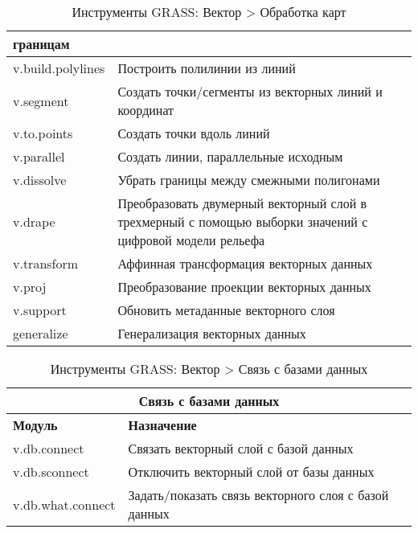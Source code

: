 {\begin{table}[H]
\begin{tabular}{|p{3cm}|p{12cm}|}
  границам \\
  \hline v.build.polylines & Построить полилинии из линий \\
  \hline v.segment & Создать точки/сегменты из векторных линий и
  координат \\
  \hline v.to.points & Создать точки вдоль линий \\
  \hline v.parallel & Создать линии, параллельные исходным \\
  \hline v.dissolve & Убрать границы между смежными полигонами \\
  \hline v.drape & Преобразовать двумерный векторный слой в трехмерный
  с помощью выборки значений с цифровой модели рельефа \\
  \hline v.transform & Аффинная трансформация векторных данных \\
  \hline v.proj & Преобразование проекции векторных данных \\
  \hline v.support & Обновить метаданные векторного слоя \\
  \hline generalize & Генерализация векторных данных \\
\hline
\end{tabular}
\caption{Инструменты GRASS: Вектор > Обработка карт}
\end{table}}

{\renewcommand{\arraystretch}{0.7}
\begin{table}[H]
\centering
 \begin{tabular}{|p{4cm}|p{11cm}|}
  \hline \multicolumn{2}{|c|}{\textbf{Связь с базами данных}} \\
  \hline \textbf{Модуль} & \textbf{Назначение} \\
  \hline v.db.connect & Связать векторный слой с базой данных \\
  \hline v.db.sconnect & Отключить векторный слой от базы данных \\
  \hline v.db.what.connect & Задать/показать связь векторного слоя с
  базой данных \\
\hline
\end{tabular}
\caption{Инструменты GRASS: Вектор > Связь с базами данных}
\end{table}}

